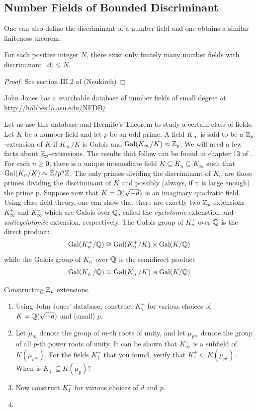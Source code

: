 \documentclass{book}
\begin{document}
\subsection{Number Fields of Bounded Discriminant}

One can also define the discriminant of a number field and one obtains a
similar finiteness theorem:

\begin{theorem}
For each positive integer $N$, there exist only finitely many number
fields with discriminant $|\Delta| \leq N$.
\end{theorem}
\begin{proof}
See section III.2 of (Neukirch)
\end{proof}

John Jones has a searchable database of number fields of small degree
at \url{http://hobbes.la.asu.edu/NFDB/}

Let us use this database and Hermite's Theorem to study a certain class
of fields.  Let $K$ be a number field and let $p$ be an odd prime.  A field
$K_\infty$ is said to be a $\mathbb{Z}_p$-extension of $K$ if $K_\infty/K$ is Galois
and $\mathrm{Gal}(K_\infty/K) \approx \mathbb{Z}_p$.  We will need a few facts
about $\mathbb{Z}_p$-extensions.  The results that follow can be found in
chapter 13 of \cite{washington:cyclo}.
For each $n \geq 0$, there is a unique intemediate field
$K \subseteq K_n \subseteq K_\infty$ such that $\mathrm{Gal}(K_n/K)
\approx \mathbb{Z}/p^n\mathbb{Z}$.  The only primes dividing the discriminant of $K_n$
are those primes dividing the discriminant of $K$ and possibly (always,
if n is large enough) the prime p.  Suppose now that $K = \mathbb{Q}(\sqrt{-d})$
is an imaginary quadratic field.  Using class field theory, one can show
that there are exactly two $\mathbb{Z}_p$ extensions $K_\infty^+$ and
$K_\infty^-$ which are Galois over $\mathbb{Q}$, called the \textit{cyclotomic}
extenstion and \textit{anticyclotomic} extension, respectively.
The Galois group of $K_n^+$ over $\mathbb{Q}$ is the
direct product:
$$
\mathrm{Gal}(K_n^+/\mathbb{Q}) \cong \mathrm{Gal}(K_n^+/K) \times
\mathrm{Gal}(K/\mathbb{Q})
$$
while the Galois group of $K_n^-$ over $\mathbb{Q}$ is the semidirect product
$$
\mathrm{Gal}(K_n^-/\mathbb{Q}) \cong \mathrm{Gal}(K_n^-/K) \rtimes
\mathrm{Gal}(K/\mathbb{Q})
$$

\begin{exercise} Constructing $\mathbb{Z}_p$ extensions.
\begin{enumerate}
\item Using John Jones' database, construct $K_1^+$ for various choices
of $K = \mathbb{Q}(\sqrt{-d})$ and (small) $p$.
\item Let $\mu_m$ denote the group of $m$-th roots of unity,
and let $\mu_{p^{\infty}}$ denote the group of all $p$-th power
roots of unity.  It can be shown that $K_\infty^+$ is a subfield of
$K(\mu_{p^\infty})$.  For the fields $K_1^+$ that you found,
verify that $K_1^+ \subseteq K(\mu_{p^2})$. When is
$K_1^+ \subseteq K(\mu_p)$?
\item Now construct $K_1^-$ for various choices of $d$ and $p$.
\item
\end{enumerate}
\end{exercise}
\end{document}
